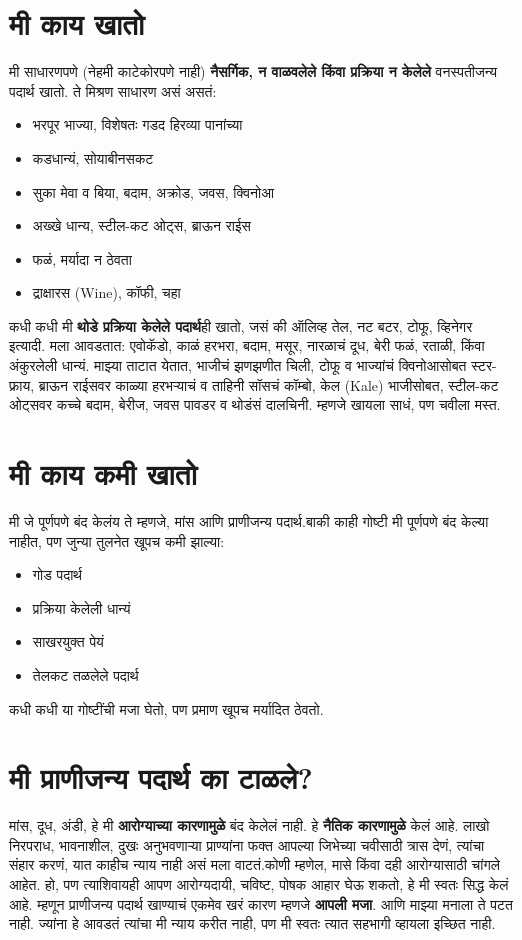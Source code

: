 \section*{मी काय खातो}
मी साधारणपणे (नेहमी काटेकोरपणे नाही) \textbf{नैसर्गिक, न वाळवलेले किंवा प्रक्रिया न केलेले} वनस्पतीजन्य पदार्थ खातो. ते मिश्रण साधारण असं असतं:
\begin{itemize}
 \item भरपूर भाज्या, विशेषतः गडद हिरव्या पानांच्या
 \item कडधान्यं, सोयाबीनसकट
 \item सुका मेवा व बिया, बदाम, अक्रोड, जवस, क्विनोआ
 \item अख्खे धान्य, स्टील-कट ओट्स, ब्राऊन राईस
 \item फळं, मर्यादा न ठेवता
 \item द्राक्षारस (Wine), कॉफी, चहा
 \end{itemize}
कधी कधी मी \textbf{थोडे प्रक्रिया केलेले पदार्थ}ही खातो,  जसं की ऑलिव्ह तेल, नट बटर, टोफू, व्हिनेगर इत्यादी.
मला आवडतात: एवोकॅडो, काळं हरभरा, बदाम, मसूर, नारळाचं दूध, बेरी फळं, रताळी, किंवा अंकुरलेली धान्यं.
माझ्या ताटात येतात,  भाजीचं झणझणीत चिली, टोफू व भाज्यांचं क्विनोआसोबत स्टर-फ्राय, ब्राऊन राईसवर काळ्या हरभऱ्याचं व ताहिनी सॉसचं कॉम्बो, केल (Kale) भाजीसोबत, स्टील-कट ओट्सवर कच्चे बदाम, बेरीज, जवस पावडर व थोडंसं दालचिनी. म्हणजे खायला साधं, पण चवीला मस्त.
\section*{मी काय कमी खातो}
मी जे पूर्णपणे बंद केलंय ते म्हणजे,  मांस आणि प्राणीजन्य पदार्थ.बाकी काही गोष्टी मी पूर्णपणे बंद केल्या नाहीत,
 पण जुन्या तुलनेत खूपच कमी झाल्या:
\begin{itemize}
 \item गोड पदार्थ
 \item प्रक्रिया केलेली धान्यं
 \item साखरयुक्त पेयं
 \item तेलकट तळलेले पदार्थ
 \end{itemize}
कधी कधी या गोष्टींची मजा घेतो, पण प्रमाण खूपच मर्यादित ठेवतो.
\section*{मी प्राणीजन्य पदार्थ का टाळले?}
मांस, दूध, अंडी, हे मी \textbf{आरोग्याच्या कारणामुळे} बंद केलेलं नाही. हे \textbf{नैतिक कारणामुळे} केलं आहे.
लाखो निरपराध, भावनाशील, दुखः अनुभवणाऱ्या प्राण्यांना फक्त आपल्या जिभेच्या चवीसाठी त्रास देणं, त्यांचा संहार करणं,  यात काहीच न्याय नाही असं मला वाटतं.कोणी म्हणेल, मासे किंवा दही आरोग्यासाठी चांगले आहेत.
 हो, पण त्याशिवायही आपण आरोग्यदायी, चविष्ट, पोषक आहार घेऊ शकतो,  हे मी स्वतः सिद्ध केलं आहे.
म्हणून प्राणीजन्य पदार्थ खाण्याचं एकमेव खरं कारण म्हणजे \textbf{आपली मजा}. आणि माझ्या मनाला ते पटत नाही. ज्यांना हे आवडतं त्यांचा मी न्याय करीत नाही, पण मी स्वतः त्यात सहभागी व्हायला इच्छित नाही.
